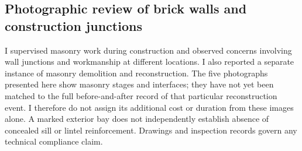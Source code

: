 \subsection{Photographic review of brick walls and construction junctions}
I supervised masonry work during construction and observed concerns involving wall junctions and workmanship at different locations. I also reported a separate instance of masonry demolition and reconstruction. The five photographs presented here show masonry stages and interfaces; they have not yet been matched to the full before-and-after record of that particular reconstruction event. I therefore do not assign its additional cost or duration from these images alone. A marked exterior bay does not independently establish absence of concealed sill or lintel reinforcement. Drawings and inspection records govern any technical compliance claim.



